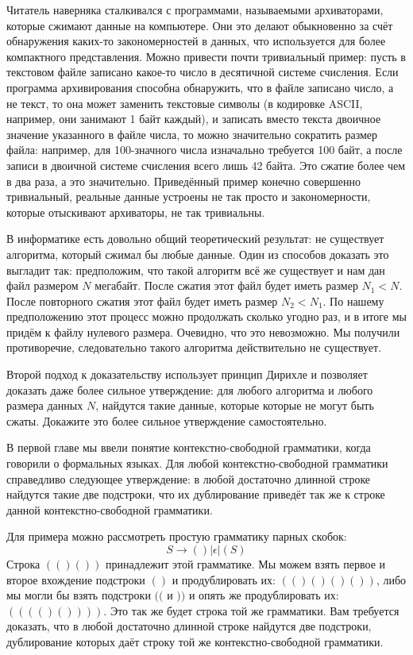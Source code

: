 \begin{exercise}
Читатель наверняка сталкивался с программами, называемыми архиваторами, которые сжимают данные на компьютере. Они это делают обыкновенно за счёт обнаружения каких-то закономерностей в данных, что используется для более компактного представления.  Можно привести почти тривиальный пример: пусть в текстовом файле записано какое-то число в десятичной системе счисления. Если программа архивирования способна обнаружить, что в файле записано число, а не текст, то она может заменить текстовые символы (в кодировке ASCII, например, они занимают 1 байт каждый), и записать вместо текста двоичное значение указанного в файле числа, то можно значительно сократить размер файла: например, для 100-значного числа изначально требуется 100 байт, а после записи в двоичной системе счисления всего лишь 42 байта. Это сжатие более чем в два раза, а это значительно. Приведённый пример конечно совершенно тривиальный, реальные данные устроены не так просто и закономерности, которые отыскивают архиваторы, не так тривиальны.

В информатике есть довольно общий теоретический результат: не существует алгоритма, который сжимал бы любые данные. Один из способов доказать это выгладит так: предположим, что такой алгоритм всё же существует и нам дан файл размером $N$ мегабайт. После сжатия этот файл будет иметь размер $N_1 < N$. После повторного сжатия этот файл будет иметь размер $N_2 < N_1$. По нашему предположению этот процесс можно продолжать сколько угодно раз, и в итоге мы придём к файлу нулевого размера. Очевидно, что это невозможно. Мы получили противоречие, следовательно такого алгоритма действительно не существует.

Второй подход к доказательству использует принцип Дирихле и позволяет доказать даже более сильное утверждение: для любого алгоритма и любого размера данных $N$, найдутся такие данные, которые которые не могут быть сжаты. Докажите это более сильное утверждение самостоятельно.
\end{exercise}

\begin{exercise}
В первой главе мы ввели понятие контекстно-свободной грамматики, когда говорили о формальных языках. Для любой контекстно-свободной грамматики справедливо следующее утверждение: в любой достаточно длинной строке найдутся такие две подстроки, что их дублирование приведёт так же к строке данной контекстно-свободной грамматики.

Для примера можно рассмотреть простую грамматику парных скобок:
$$S \to () | \epsilon | (S)$$
Строка $(()())$ принадлежит этой грамматике. Мы можем взять первое и второе вхождение подстроки $()$ и продублировать их: $(()()()())$, либо мы могли бы взять подстроки $(($ и $))$ и опять же продублировать их: $(((()())))$. Это так же будет строка той же грамматики. Вам требуется доказать, что в любой достаточно длинной строке найдутся две подстроки, дублирование которых даёт строку той же контекстно-свободной грамматики.
\end{exercise}

